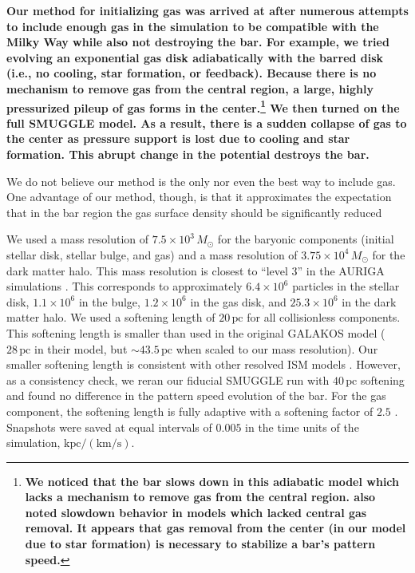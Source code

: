 \documentclass[twocolumn,linenumbers,trackchanges]{aastex631}
\begin{document}
{\bf Our method for initializing gas was arrived at after numerous attempts to
include enough gas in the simulation to be compatible with the Milky Way while
also not destroying the bar. For example, we tried evolving an exponential gas
disk adiabatically with the barred disk (i.e., no cooling, star formation, or
feedback). Because there is no mechanism to remove gas from the central region,
a large, highly pressurized pileup of gas forms in the center.\footnote{{\bf We
noticed that the bar slows down in this adiabatic model which lacks a mechanism
to remove gas from the central region. \citet{2007ApJ...666..189B} also noted
slowdown behavior in models which lacked central gas removal. It appears that
gas removal from the center (in our model due to star formation) is necessary to
stabilize a bar's pattern speed.}} We then turned on the full SMUGGLE model. As
a result, there is a sudden collapse of gas to the center as pressure support is
lost due to cooling and star formation. This abrupt change in the potential
destroys the bar. 

We do not believe our method is the only nor even the best way to include gas.
One advantage of our method, though, is that it approximates the expectation
that in the bar region the gas surface density should be significantly reduced
\citep[e.g.][]{1993RPPh...56..173S}}

We used a mass resolution of $7.5\times10^3\,M_{\odot}$ for the baryonic
components (initial stellar disk, stellar bulge, and gas) and a mass resolution
of $3.75\times10^4\,M_{\odot}$ for the dark matter halo. This mass resolution is
closest to ``level 3'' in the AURIGA simulations \citep{2017MNRAS.467..179G}.
This corresponds to approximately $6.4\times10^6$ particles in the stellar disk,
$1.1\times10^6$ in the bulge, $1.2\times10^6$ in the gas disk, and
$25.3\times10^6$ in the dark matter halo. We used a softening length of
$20\,\textrm{pc}$ for all collisionless components. This softening length is
smaller than used in the original GALAKOS model ($28\,\textrm{pc}$ in their
model, but $\sim43.5\,\textrm{pc}$ when scaled to our mass resolution). Our
smaller softening length is consistent with other resolved ISM models
\citep{2018MNRAS.480..800H, 2019MNRAS.489.4233M}. However, as a consistency
check, we reran our fiducial SMUGGLE run with $40\,\textrm{pc}$ softening and
found no difference in the pattern speed evolution of the bar. For the gas
component, the softening length is fully adaptive with a softening factor of
$2.5$ \citep[e.g.,][]{2020ApJS..248...32W}. Snapshots were saved at equal
intervals of $0.005$ in the time units of the simulation,
$\textrm{kpc}/(\textrm{km}/\textrm{s})$.
\end{document}
